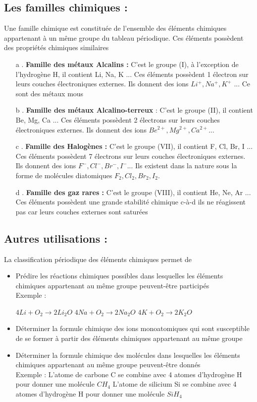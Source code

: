 \documentclass[12pt]{article}
\begin{document}
\subsection{Les familles chimiques : }
Une famille chimique est constituée de l’ensemble des éléments chimiques
appartenant à un même groupe du tableau périodique. Ces éléments
possèdent des propriétés chimiques similaires
 \begin{enumerate}
     \item[a .]\textbf{Famille des métaux Alcalins :} C’est le groupe (I), à l’exception de l’hydrogène H, il contient Li, Na, K ... Ces éléments
possèdent 1 électron sur leurs couches électroniques externes. Ils donnent des ions $Li^+,Na^+,K^+$ ... Ce sont des métaux mous
\item[b .] \textbf{Famille des métaux Alcalino-terreux } : C’est le groupe (II), il contient Be, Mg, Ca ... Ces éléments possèdent 2 électrons sur leurs
couches électroniques externes. Ils donnent des ions $Be^{2+}, Mg^{2+}, Ca^{2+}...$
\item[c .] \textbf{Famille des Halogènes : } C’est le groupe (VII), il contient F, Cl, Br, I ... Ces éléments possèdent 7 électrons sur leurs
couches électroniques externes. Ils donnent des ions $F^-, Cl^-, Br^-, I^- $... Ils existent dans la nature sous la forme de molécules diatomiques $F_2, Cl_2, Br_2, I_2$.
\item[d .] \textbf{Famille des gaz rares : }C’est le groupe (VIII), il contient He, Ne, Ar ... Ces éléments possèdent une grande stabilité
chimique c-à-d ils ne réagissent pas car leurs couches externes sont saturées
 \end{enumerate}
\subsection{Autres utilisations :  }La classification périodique des éléments chimiques permet de 
\begin{itemize}
    \item Prédire les réactions chimiques possibles dans lesquelles les éléments chimiques
appartenant au même groupe peuvent-être participés
\\Exemple :

$4Li + O_2 \rightarrow 2Li_2O$ \hspace{1cm} $4Na + O_2 \rightarrow 2 Na_2O $ \hspace{1cm} $4K + O_2 \rightarrow 2K_2O$
\item Déterminer la formule chimique des ions monoatomiques qui sont susceptible de se
former à partir des éléments chimiques appartenant au même groupe
\item Déterminer la formule chimique des molécules dans lesquelles les éléments chimiques
appartenant au même groupe peuvent-être donnés
\\Exemple : 
L’atome de carbone C se combine avec 4 atomes d’hydrogène H pour donner une
molécule $CH_4$
L’atome de silicium Si se combine avec 4 atomes d’hydrogène H pour donner une
molécule $SiH_4$

\end{itemize}
\end{document}
